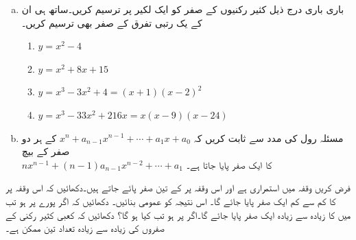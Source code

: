 
\begin{enumerate}[a.]
\item
باری باری درج ذیل کثیر رکنیوں کے صفر کو ایک لکیر پر ترسیم کریں۔ساتھ ہی ان کے یک رتبی تفرق کے  صفر بھی ترسیم کریں۔
\begin{enumerate}[1.]
\item
$y=x^2-4$
\item
$y=x^2+8x+15$
\item
$y=x^3-3x^2+4=(x+1)(x-2)^2$
\item
$y=x^3-33x^2+216x=x(x-9)(x-24)$
\end{enumerate}
\item
مسئلہ رول کی مدد سے ثابت کریں کہ 
$x^n+a_{n-1}x^{n-1}+\cdots+a_1x+a_0$
کے ہر دو صفر کے بیچ \\
$nx^{n-1}+(n-1)a_{n-1}x^{n-2}+\cdots+a_1$
کا ایک صفر پایا جاتا ہے۔
\end{enumerate}
فرض کریں وقفہ  میں  استمراری ہے اور اس وقفہ پر  کے تین صفر پائے جاتے ہیں۔دکھائیں کہ اس وقفہ پر  کا کم سے کم ایک صفر پایا جائے گا۔ اس نتیجہ کو عمومی بنائیں۔
دکھائیں کہ اگر پورے  پر   ہو تب  میں  کا زیادہ سے زیادہ ایک صفر پایا جائے گا۔اگر  پر  ہو تب کیا ہو گا؟
دکھائیں کہ کعبی کثیر رکنی کے صفروں کی زیادہ سے زیادہ تعداد تین ممکن ہے۔

